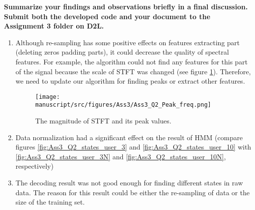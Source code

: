 \item \textbf{Summarize your findings and observations briefly in a final discussion. Submit both the developed code and your document to the Assignment 3 folder on D2L.}
\begin{enumerate}
\item Although re-sampling has some positive effects on features extracting part (deleting zeros padding parts), it could decrease the quality of spectral features. For example, the algorithm could not find any features for this part of the signal because the scale of STFT was changed (see figure \ref{fig:Ass3_Q2_Peak_freq}). Therefore, we need to update our algorithm for finding peaks or extract other features.

\begin{figure}[H]
    \centering
    \begin{minipage}[b]{1\textwidth}
        \texttt{[image: manuscript/src/figures/Ass3/Ass3\_Q2\_Peak\_freq.png]}
    \end{minipage}
    \caption{The magnitude of STFT and its peak values.}
    \label{fig:Ass3_Q2_Peak_freq}
\end{figure}

\item Data normalization had a significant effect on the result of HMM (compare figures \ref{fig:Ass3_Q2_states_user_3} and \ref{fig:Ass3_Q2_states_user_10} with \ref{fig:Ass3_Q2_states_user_3N} and \ref{fig:Ass3_Q2_states_user_10N}, respectively)

\item The decoding result was not good enough for finding different states in raw data. The reason for this result could be either the re-sampling of data or the size of the training set.


\end{enumerate}

